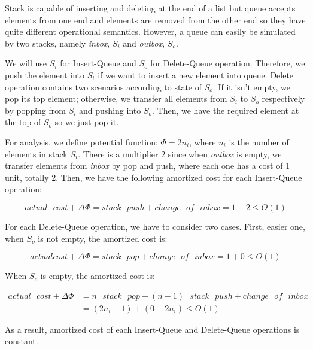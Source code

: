 Stack is capable of inserting and deleting at the end of a list but queue accepts elements from one end and elements are removed from the other end so they have quite different operational semantics. However, a queue can easily be simulated by two stacks, namely \textit{inbox}, $S_{i}$ and \textit{outbox}, $S_{o}$.

We will use $S_{i}$ for Insert-Queue and $S_{o}$ for Delete-Queue operation. Therefore, we push the element into $S_{i}$ if we want to insert a new element into queue. Delete operation contains two scenarios according to state of $S_{o}$. If it isn't empty, we pop its top element; otherwise, we transfer all elements from $S_{i}$ to $S_{o}$ respectively by popping from $S_{i}$ and pushing into $S_{o}$. Then, we have the required element at the top of $S_{o}$ so we just pop it.

For analysis, we define potential function: $\Phi = 2n_{i}$, where $n_{i}$ is the number of elements in stack $S_{i}$. There is a multiplier 2 since when \textit{outbox} is empty, we transfer elements from \textit{inbox} by pop and push, where each one has a cost of 1 unit, totally 2. Then, we have the following amortized cost for each Insert-Queue operation:

$$
	actual\text{ }cost + \Delta\Phi = stack\text{ }push + change\text{ }of\text{ }inbox = 1 + 2 \leq O(1)
$$

For each Delete-Queue operation, we have to consider two cases. First, easier one, when $S_{o}$ is not empty, the amortized cost is:

$$
	actual cost + \Delta\Phi = stack\text{ }pop + change\text{ }of\text{ }inbox = 1 + 0 \leq O(1)
$$

When $S_{o}$ is empty, the amortized cost is:

\begin{align*}
	actual\text{ }cost + \Delta\Phi &=  n\text{ }stack\text{ }pop + (n-1)\text{ }stack\text{ }push + change\text{ }of\text{ }inbox \\
	&= (2n_{i} - 1) + (0 - 2n_{i}) \leq O(1)
\end{align*}

As a result, amortized cost of each Insert-Queue and Delete-Queue operations is constant.